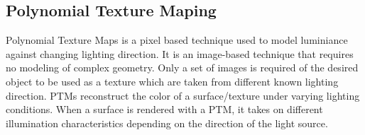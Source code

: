 % 


\subsection{Polynomial Texture Maping}

Polynomial Texture Maps is a pixel based technique used to model luminiance
against changing lighting direction. 
It is an image-based technique that requires
no modeling of complex geometry. Only a set of images is required of the desired object to be used as a
texture which are taken from different known lighting
direction. 
PTMs reconstruct the color of a surface/texture under varying lighting
conditions. When a surface is rendered with a PTM, it takes on different illumination
characteristics depending on the direction of the light source.


